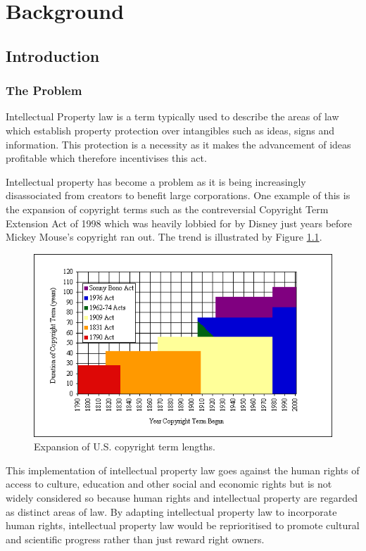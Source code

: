 \chapter{Background}
	\section{Introduction}
		\subsection{The Problem}
			Intellectual Property law is a term typically used to describe the areas of law which establish property protection over intangibles such as ideas, signs and information\cite{ip_edu_bently}. This protection is a necessity as it makes the advancement of ideas profitable which therefore incentivises this act\cite{ip_edu_bently}.
			
			Intellectual property has become a problem as it is being increasingly disassociated from creators to benefit large corporations\cite{handbook_ip_hr_geiger}. One example of this is the expansion of copyright terms such as the contreversial Copyright Term Extension Act of 1998 which was heavily lobbied for by Disney just years before Mickey Mouse's copyright ran out\cite{mickey_mouse_grzelak}. The trend is illustrated by Figure \ref{fig:ext_us_cop}. 

			\begin{figure}[h]
    			\centering
    			\includegraphics[width=0.5\linewidth]{resources/images/extention_of_us_copyright.png}
    			\caption{Expansion of U.S. copyright term lengths\cite{copyright_term_length_graph_bell}.}
    			\label{fig:ext_us_cop}
			\end{figure}
			
			This implementation of intellectual property law goes against the human rights of access to culture, education and other social and economic rights but is not widely considered so because human rights and intellectual property are regarded as distinct areas of law. By adapting intellectual property law to incorporate human rights, intellectual property law would be reprioritised to promote cultural and scientific progress rather than just reward right owners\cite{handbook_ip_hr_geiger}.
			
